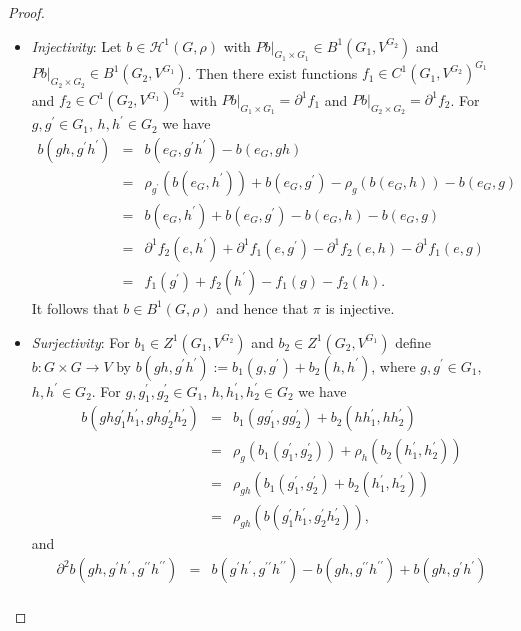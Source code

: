 \documentclass[a4paper,11pt,reqno]{amsart}
\numberwithin{equation}{section}
\theoremstyle{definition}
\theoremstyle{remark}
\theoremstyle{remark}
\begin{document}
\begin{proof}
\begin{itemize}
\item \emph{Injectivity}: Let $b\in\mathcal{H}^{1}(G,\rho)$ with $Pb|_{G_{1}\times G_{1}}\in B^{1}(G_{1},V^{G_{2}})$ and $Pb|_{G_{2}\times G_{2}}\in B^{1}(G_{2},V^{G_{1}})$. Then there exist functions $f_{1}\in C^{1}(G_{1},V^{G_{2}})^{G_{1}}$ and $f_{2}\in C^{1}(G_{2},V^{G_{1}})^{G_{2}}$ with $Pb|_{G_{1}\times G_{1}}=\partial^{1}f_{1}$ and $Pb|_{G_{2}\times G_{2}}=\partial^{1}f_{2}$. For $g,g^{\prime}\in G_{1}$, $h,h^{\prime}\in G_{2}$ we have 
\begin{eqnarray*}
b(gh,g^{\prime}h^{\prime}) & = & b(e_{G},g^{\prime}h^{\prime})-b(e_{G},gh)\\
 & = & \rho_{g^{\prime}}\left(b(e_{G},h^{\prime})\right)+b(e_{G},g^{\prime})-\rho_{g}\left(b(e_{G},h)\right)-b(e_{G},g)\\
 & = & b(e_{G},h^{\prime})+b(e_{G},g^{\prime})-b(e_{G},h)-b(e_{G},g)\\
 & = & \partial^{1}f_{2}(e,h^{\prime})+\partial^{1}f_{1}(e,g^{\prime})-\partial^{1}f_{2}(e,h)-\partial^{1}f_{1}(e,g)\\
 & = & f_{1}(g^{\prime})+f_{2}(h^{\prime})-f_{1}(g)-f_{2}(h).
\end{eqnarray*}
It follows that $b\in B^{1}(G,\rho)$ and hence that $\pi$ is injective.
\item \emph{Surjectivity}: For $b_{1}\in Z^{1}(G_{1},V^{G_{2}})$ and $b_{2}\in Z^{1}(G_{2},V^{G_{1}})$ define $b:G\times G\rightarrow V$ by $b(gh,g^{\prime}h^{\prime}):=b_{1}(g,g^{\prime})+b_{2}(h,h^{\prime})$, where $g,g^{\prime}\in G_{1}$, $h,h^{\prime}\in G_{2}$. For $g,g_{1}^{\prime},g_{2}^{\prime}\in G_{1}$, $h,h_{1}^{\prime},h_{2}^{\prime}\in G_{2}$ we have 
\begin{eqnarray*}
b(ghg_{1}^{\prime}h_{1}^{\prime},ghg_{2}^{\prime}h_{2}^{\prime}) & = & b_{1}(gg_{1}^{\prime},gg_{2}^{\prime})+b_{2}(hh_{1}^{\prime},hh_{2}^{\prime})\\
 & = & \rho_{g}\left(b_{1}(g_{1}^{\prime},g_{2}^{\prime})\right)+\rho_{h}\left(b_{2}(h_{1}^{\prime},h_{2}^{\prime})\right)\\
 & = & \rho_{gh}\left(b_{1}(g_{1}^{\prime},g_{2}^{\prime})+b_{2}(h_{1}^{\prime},h_{2}^{\prime})\right)\\
 & = & \rho_{gh}\left(b(g_{1}^{\prime}h_{1}^{\prime},g_{2}^{\prime}h_{2}^{\prime})\right),
\end{eqnarray*}
and 
\begin{eqnarray*}
\partial^{2}b(gh,g^{\prime}h^{\prime},g^{\prime\prime}h^{\prime\prime}) & = & b(g^{\prime}h^{\prime},g^{\prime\prime}h^{\prime\prime})-b(gh,g^{\prime\prime}h^{\prime\prime})+b(gh,g^{\prime}h^{\prime})\\

\end{eqnarray*}
\end{itemize}
\end{proof}
\end{document}
